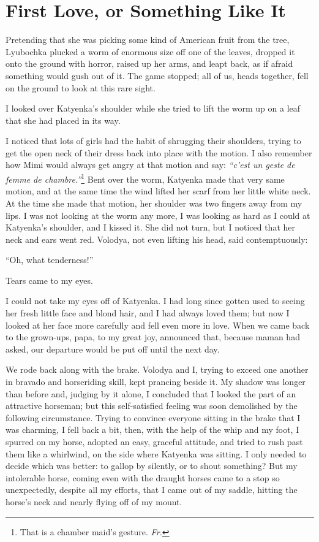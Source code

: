 \chapter{First Love, or Something Like It} %

Pretending that she was picking some kind of American fruit from the tree, Lyubochka plucked a worm of enormous size off one of the leaves, dropped it onto the ground with horror, raised up her arms, and leapt back, as if afraid something would gush out of it. The game stopped; all of us, heads together, fell on the ground to look at this rare sight.

I looked over Katyenka's shoulder while she tried to lift the worm up on a leaf that she had placed in its way.

I noticed that lots of girls had the habit of shrugging their shoulders, trying to get the open neck of their dress back into place with the motion. I also remember how Mimi would always get angry at that motion and say: \textit{``c'est un geste de femme de chambre.''}\footnote{That is a chamber maid's gesture. \textit{Fr.}} Bent over the worm, Katyenka made that very same motion, and at the same time the wind lifted her scarf from her little white neck. At the time she made that motion, her shoulder was two fingers away from my lips. I was not looking at the worm any more, I was looking as hard as I could at Katyenka's shoulder, and I kissed it. She did not turn, but I noticed that her neck and ears went red. Volodya, not even lifting his head, said contemptuously:

``Oh, what tenderness!'' %

Tears came to my eyes.

I could not take my eyes off of Katyenka. I had long since gotten used to seeing her fresh little face and blond hair, and I had always loved them; but now I looked at her face more carefully and fell even more in love. When we came back to the grown-ups, papa, to my great joy, announced that, because maman had asked, our departure would be put off until the next day.

We rode back along with the brake. Volodya and I, trying to exceed one another in bravado and horseriding skill, kept prancing beside it. My shadow was longer than before and, judging by it alone, I concluded that I looked the part of an attractive horseman; but this self-satisfied feeling was soon demolished by the following circumstance. Trying to convince everyone sitting in the brake that I was charming, I fell back a bit, then, with the help of the whip and my foot, I spurred on my horse, adopted an easy, graceful attitude, and tried to rush past them like a whirlwind, on the side where Katyenka was sitting. I only needed to decide which was better: to gallop by silently, or to shout something? But my intolerable horse, coming even with the draught horses came to a stop so unexpectedly, despite all my efforts, that I came out of my saddle, hitting the horse's neck and nearly flying off of my mount.

